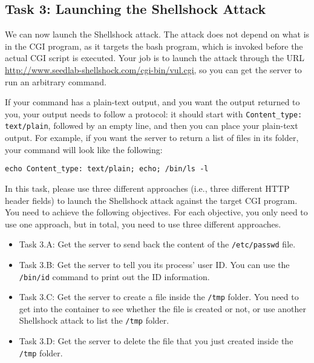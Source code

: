 \subsection{Task 3: Launching the Shellshock Attack}

We can now launch the Shellshock attack. 
The attack does not depend on what is in the CGI program, as it targets
the bash program, which is invoked before the actual CGI script is
executed. Your job is to launch the attack through the URL
\url{http://www.seedlab-shellshock.com/cgi-bin/vul.cgi}, so you can
get the server to run an arbitrary command. 


If your command has a plain-text output, and you want the output returned to you,
your output needs to follow a protocol: it should start with 
\texttt{Content\_type: text/plain}, followed by an empty line, and then
you can place your plain-text output. For example, if you want the
server to return a list of files in its folder, your command  
will look like the following: 

\begin{lstlisting}
echo Content_type: text/plain; echo; /bin/ls -l
\end{lstlisting}
 

In this task, please use three different approaches (i.e., three different HTTP header fields)
to launch the Shellshock attack against the target CGI program. You need to achieve 
the following objectives. For each objective, you only need to use one approach,
but in total, you need to use three different approaches. 

\begin{itemize}
\item Task 3.A: Get the server to send back the content of the \texttt{/etc/passwd} file. 

\item Task 3.B: Get the server to tell you its process' user ID. You can use 
the \texttt{/bin/id} command to print out the ID information. 

\item Task 3.C: Get the server to create a file inside the \texttt{/tmp} folder. You need to 
get into the container to see whether the file is created or not, or use 
another Shellshock attack to list the \texttt{/tmp} folder.

\item Task 3.D: Get the server to delete the file that you just created 
inside the \texttt{/tmp} folder. 
\end{itemize} 


